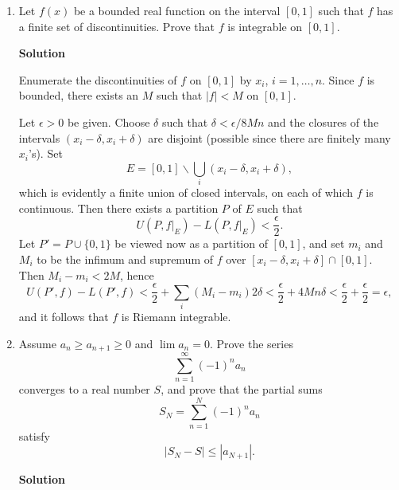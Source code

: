 \documentclass{article}
\begin{document}
\begin{enumerate}
\item Let \(f(x)\) be a bounded real function on the interval \([0,1]\) such that \(f\) has a finite set of discontinuities.  Prove that \(f\) is integrable on \([0,1]\).

{\bf Solution}

Enumerate the discontinuities of \(f\) on \([0,1]\) by \(x_i\), \(i = 1, \ldots, n\).  Since \(f\) is bounded, there exists an \(M\) such that \(|f| < M\) on \([0,1]\).

Let \(\epsilon > 0\) be given.  Choose \(\delta\) such that \(\delta < \epsilon / 8 M n\) and the closures of the intervals \((x_i - \delta, x_i + \delta)\) are disjoint (possible since there are finitely many \(x_i\)'s).  Set
\[E = [0,1] \backslash \bigcup_i (x_i - \delta, x_i + \delta),\]
which is evidently a finite union of closed intervals, on each of which \(f\) is continuous.  Then there exists a partition \(P\) of \(E\) such that
\[U(P,f|_E) - L(P,f|_E) < \frac{\epsilon}{2}.\]
Let \(P' = P \cup \{0,1\}\) be viewed now as a partition of \([0,1]\), and set \(m_i\) and \(M_i\) to be the infimum and supremum of \(f\) over \([x_i - \delta, x_i + \delta] \cap [0,1]\).  Then \(M_i - m_i < 2M\), hence
\[U(P',f) - L(P',f) < \frac{\epsilon}{2} + \sum_i (M_i - m_i) 2 \delta
                    < \frac{\epsilon}{2} + 4 M n \delta
                    < \frac{\epsilon}{2} + \frac{\epsilon}{2}
                    = \epsilon,\]
and it follows that \(f\) is Riemann integrable.



\item Assume \(a_n \geq a_{n + 1} \geq 0\) and \(\lim a_n = 0\).  Prove the series
\[\sum_{n = 1}^{\infty} (-1)^n a_n\]
converges to a real number \(S\), and prove that the partial sums
\[S_N = \sum_{n = 1}^N (-1)^n a_n\]
satisfy
\[|S_N - S| \leq |a_{N + 1}|.\]

{\bf Solution}


\end{enumerate}
\end{document}

